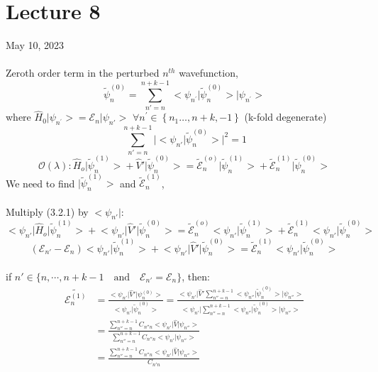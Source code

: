 \documentclass[12pt,fancychapters]{report}
\numberwithin{equation}{section}
\begin{document}
\section{Lecture 8}
May 10, 2023\\
\\
Zeroth order term in the perturbed $n^{th}$ wavefunction, 
$$
\tilde{\psi}_n^{(0)}=\sum_{n'=n}^{n+k-1}\big<\psi_{n^{\prime}} 
\big| \tilde{\psi}_n^{(0)}\big>\big|\psi_{n^{\prime}}\big>
$$
where $\hat{H}_0\big|\psi_{n^{\prime}}\big>=
\mathcal{E}_n\big|\psi_{n'}\big>$ $\forall n^{\prime} \in\left\{n_1 \ldots,
n+k,-1\right\}$
(k-fold degenerate)
\[\sum_{n'=n}^{n+k-1}\big|\big<\psi_{n'} \big| \tilde
{\psi}_n^{(0)}\big>\big|^2=1\]
\begin{equation}
	\mathcal{O}(\lambda): \hat{H}_o \big|\tilde{\psi}_n^{(1)}\big> + \hat{V}'\big|\tilde{
	\psi}_n^{(0)}\big> = \tilde{\mathcal{E}}_n^{(o)}\big|\tilde{\psi}_n^{(1)}\big>+
	\tilde{\mathcal{E}}_n^{(1)}\big|\tilde{\psi}_n^{(0)}\big>
\end{equation}
We need to find $ \big|\tilde{\psi}_n^{(1)}\big>$ and $\tilde{\mathcal{E}}_n^{(1)}$,\\
\\
Multiply (3.2.1) by $\big<\psi_{n'}\big|$:
\[
	\big<\psi_{n'}\big|\hat{H}_o \big|\tilde{\psi}_n^{(1)}\big> + \big<\psi_{n'}\big|\hat{V}'
	\big|\tilde{\psi}_n^{(0)}\big> = \tilde{\mathcal{E}}_n^{(o)}\big<\psi_{n'}\big|\tilde{\psi}
	_n^{(1)}\big>+\tilde{\mathcal{E}}_n^{(1)}\big<\psi_{n'}\big|\tilde{\psi}_n^{(0)}\big>
\]
\[
	\left(\mathcal{E}_{n'}- \mathcal{E}_n\right)\big<\psi_{n'}\big|\tilde{\psi}_n^{(1)}\big> + \big<\psi_{n'}\big|\hat{V}'
	\big|\tilde{\psi}_n^{(0)}\big> =\tilde{\mathcal{E}}_n^{(1)}\big<\psi_{n'}\big|\tilde{\psi}_n^{(0)}\big>
\]\\
if $n' \in \{n, \cdots, n+k-1 \quad \text{and}\quad \mathcal{E}_{n'}=\mathcal{E}_n\}$, then:
\begin{align*}
  \tilde{\mathcal{E}_n^{(1)}} &= \frac{\big<\psi_{n'}\big|\hat{V}'\big|\psi_n^{(0)}\big>}
  {\big<\psi_{n'}\big|\tilde{\psi}_n^{(0)}\big>} = \frac{\big<\psi_{n'}\big|\hat{V}'\sum_{n''=n}
  ^{n+k-1} \big<\psi_{n''}\big|\tilde{\psi}_n^{(0)}\big>\big|\psi_{n''}   \big>}
  {\big<\psi_{n'}\big|\sum_{n''=n}^{n+k-1}\big<\psi_{n''}\big|\tilde{\psi}_n^{(0)}\big>\big| 
  \psi_{n''} \big>}\\
  &= \frac{\sum_{n''=n}^{n+k-1} C_{n'' n}\big<\psi_{n'}\big|\hat{V}\big|\psi_{n''}\big>}
  {\sum_{n''=n}^{n+k-1} C_{n''n}\big<\psi_{n'}\big|\psi_{n''}\big>}\\
  &= \frac{\sum_{n''=n}^{n+k-1} C_{n''n}\big<\psi_{n'}\big|\hat{V}\big| \psi_{n''} \big>}
  {C_{n'n}}
\end{align*}
\end{document}
